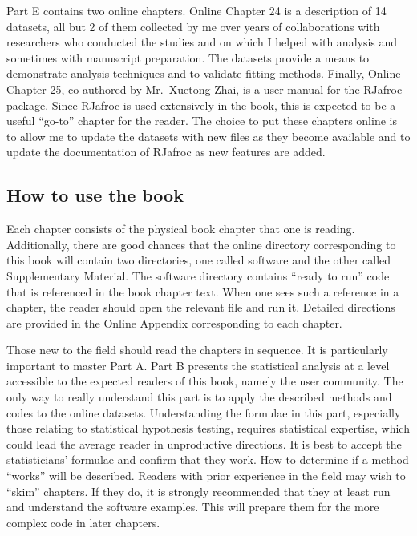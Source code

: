 \documentclass[
]{book}
\begin{document}
Part E contains two online chapters. Online Chapter 24 is a description of 14 datasets, all but 2 of them collected by me over years of collaborations with researchers who conducted the studies and on which I helped with analysis and sometimes with manuscript preparation. The datasets provide a means to demonstrate analysis techniques and to validate fitting methods. Finally, Online Chapter 25, co-authored by Mr.~Xuetong Zhai, is a user-manual for the RJafroc package. Since RJafroc is used extensively in the book, this is expected to be a useful ``go-to'' chapter for the reader. The choice to put these chapters online is to allow me to update the datasets with new files as they become available and to update the documentation of RJafroc as new features are added.

\hypertarget{how-to-use-the-book}{%
\subsection{How to use the book}\label{how-to-use-the-book}}

Each chapter consists of the physical book chapter that one is reading. Additionally, there are good chances that the online directory corresponding to this book will contain two directories, one called software and the other called Supplementary Material. The software directory contains ``ready to run'' code that is referenced in the book chapter text. When one sees such a reference in a chapter, the reader should open the relevant file and run it. Detailed directions are provided in the Online Appendix corresponding to each chapter.

Those new to the field should read the chapters in sequence. It is particularly important to master Part A. Part B presents the statistical analysis at a level accessible to the expected readers of this book, namely the user community. The only way to really understand this part is to apply the described methods and codes to the online datasets. Understanding the formulae in this part, especially those relating to statistical hypothesis testing, requires statistical expertise, which could lead the average reader in unproductive directions. It is best to accept the statisticians' formulae and confirm that they work. How to determine if a method ``works'' will be described. Readers with prior experience in the field may wish to ``skim'' chapters. If they do, it is strongly recommended that they at least run and understand the software examples. This will prepare them for the more complex code in later chapters.
\end{document}
